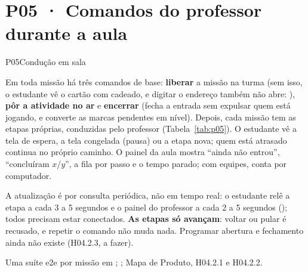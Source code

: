 \section{P05 · Comandos do professor durante a aula}
\label{sec:p05}

\begin{resposta}{P05}{Condução em sala}{\variapormissao}
\begin{campos}
  \item[Hoje] Em toda missão há três comandos de base: \textbf{liberar} a
    missão na turma (sem isso, o estudante vê o cartão com cadeado, e
    digitar o endereço também não abre: ), \textbf{pôr a
    atividade no ar} e \textbf{encerrar} (fecha a entrada sem expulsar quem
    está jogando, e converte as marcas pendentes em nível). Depois, cada
    missão tem as etapas próprias, conduzidas pelo professor
    (Tabela~\ref{tab:p05}). O estudante vê a tela de espera, a tela
    congelada (pausa) ou a etapa nova; quem está atrasado continua no próprio
    caminho. O painel da aula mostra ``ainda não entrou'', ``concluíram
    $x$/$y$'', a fila por passo e o tempo parado; com equipes, conta por
    computador.
  \item[Limitações] A atualização é por consulta periódica, não em tempo
    real: o estudante relê a etapa a cada 3 a 5 segundos e o painel do
    professor a cada 2 a 5 segundos (); todos precisam estar
    conectados. \textbf{As etapas só avançam}: voltar ou pular é recusado, e
    repetir o comando não muda nada. Programar abertura e fechamento ainda não
    existe (H04.2.3, a fazer).
  \item[Evidência] Uma suíte e2e por missão em ;
    ; Mapa de
    Produto, H04.2.1 e H04.2.2.
\end{campos}
\end{resposta}

